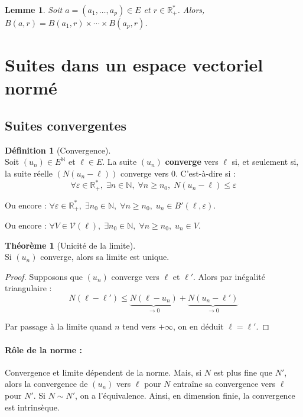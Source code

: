 \documentclass[12pt]{book}
\let\ensembleNombre\mathbb
\newcommand*\N{\ensuremath{\ensembleNombre{N}}}
\newcommand*\R{\ensuremath{\ensembleNombre{R}}}
\newtheorem*{lemme}{Lemme}
\theoremstyle{definition}
\newtheorem*{defi}{Définition}
\newtheorem{thme}{Théorème}[chapter]
\theoremstyle{remark}
\newenvironment{fdef}
  {\begin{mdframed}[roundcorner=10pt, linewidth=1pt]\begin{defi}}
  {\end{defi}\end{mdframed}}
\newenvironment{fthme}
  {\begin{mdframed}[roundcorner=10pt, linewidth=2pt]\begin{thme}}
  {\end{thme}\end{mdframed}}
\begin{document}
	\begin{lemme}
	Soit $a = (a_1, \ldots, a_p) \in E$ et $r \in \R_+^*$. Alors, $B(a,r) = B(a_1, r) \times \cdots \times B(a_p, r)$.
	\end{lemme}
	
	\section{Suites dans un espace vectoriel normé}
		\subsection{Suites convergentes}
	\begin{fdef}[Convergence]\mbox{~}\\
	Soit $(u_n) \in E^\N$ et $\ell \in E$. La suite $(u_n)$ \textbf{converge} vers $\ell$ si, et seulement si, la suite réelle $(N(u_n-\ell))$ converge vers 0. C'est-à-dire si :
	\[ \forall \varepsilon \in \R_+^*,\; \exists n \in \N, \; \forall n \geq n_0,\; N(u_n-\ell) \leq \varepsilon \]
	
	Ou encore : $\forall \varepsilon \in \R_+^*,\; \exists n_0 \in \N, \; \forall n \geq n_0,\; u_n \in B'(\ell, \varepsilon)$.
	
	Ou encore : $\forall V \in \mathcal V(\ell), \; \exists n_0 \in \N,\; \forall n \geq n_0,\; u_n \in V$.
	\end{fdef}
	
	\begin{fthme}[Unicité de la limite]\mbox{~}\\
	Si $(u_n)$ converge, alors sa limite est unique.
	\end{fthme}
	\begin{proof}
	Supposons que $(u_n)$ converge vers $\ell$ et $\ell'$. Alors par inégalité triangulaire : 
	\[N(\ell - \ell') \leq \underbrace{N(\ell - u_n)}_{\longrightarrow 0} + \underbrace{N(u_n - \ell')}_{\longrightarrow 0}\]
	
	Par passage à la limite quand $n$ tend vers $+\infty$, on en déduit $\ell = \ell'$.
	\end{proof}
	
	\paragraph{Rôle de la norme : } Convergence et limite dépendent de la norme. Mais, si $N$ est plus fine que $N'$, alors la convergence de $(u_n)$ vers $\ell$ pour $N$ entraîne sa convergence vers $\ell$ pour $N'$. Si $N \sim N'$, on a l'équivalence. Ainsi, en dimension finie, la convergence est intrinsèque.
	
\end{document}
